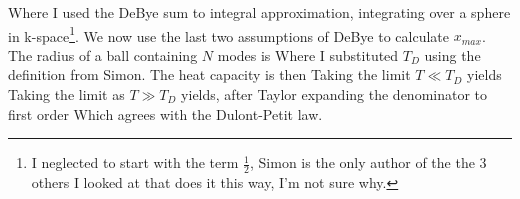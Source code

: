 Where I used the DeBye sum to integral approximation, integrating over a sphere in k-space\footnote{I neglected to start with the term $\frac{1}{2}$, Simon is the only author of the the 3 others I looked at that does it this way, I'm not sure why.}.
We now use the last two assumptions of DeBye to calculate $x_{max}$. The radius of a ball containing $N$ modes is
Where I substituted $T_D$ using the definition from Simon.
The heat capacity is then
Taking the limit $T \ll T_D$ yields
Taking the limit as $T \gg T_D$ yields, after Taylor expanding the denominator to first order
Which agrees with the Dulont-Petit law.
